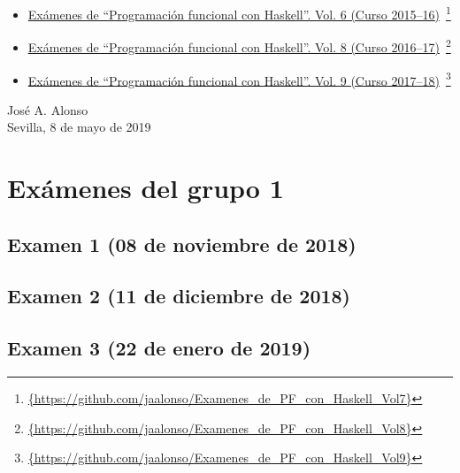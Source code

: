 \documentclass[a4paper,12pt,twoside]{book}
\begin{document}
\begin{itemize}
\item
  \href{https://github.com/jaalonso/Examenes_de_PF_con_Haskell_Vol7}
  {Exámenes de ``Programaci\'on funcional con Haskell''.
    Vol. 6 (Curso 2015--16)}\
    \footnote{\url{{https://github.com/jaalonso/Examenes_de_PF_con_Haskell_Vol7}}}

\item
  \href{https://github.com/jaalonso/Examenes_de_PF_con_Haskell_Vol8}
  {Exámenes de ``Programaci\'on funcional con Haskell''.
    Vol. 8 (Curso 2016--17)}\
    \footnote{\url{{https://github.com/jaalonso/Examenes_de_PF_con_Haskell_Vol8}}}

\item
  \href{https://github.com/jaalonso/Examenes_de_PF_con_Haskell_Vol9}
  {Exámenes de ``Programaci\'on funcional con Haskell''.
    Vol. 9 (Curso 2017--18)}\
    \footnote{\url{{https://github.com/jaalonso/Examenes_de_PF_con_Haskell_Vol9}}}

\end{itemize}
     
\begin{flushright}
  José A. Alonso \\
  Sevilla, 8 de mayo de 2019
\end{flushright}

\chapter{Exámenes del grupo 1}
\section{Examen 1 (08 de noviembre de 2018)}
\section{Examen 2 (11 de diciembre de 2018)}
\section{Examen 3 (22 de enero de 2019)}
 \label{examen_18_19_1_3}
\end{document}
